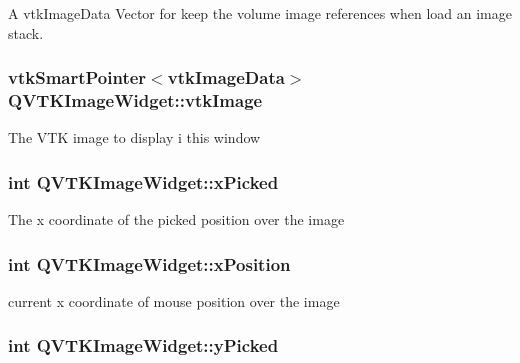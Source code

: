 A vtk\-Image\-Data Vector for keep the volume image references when load an image stack. 

\hypertarget{class_q_v_t_k_image_widget_aa55aaf6e037ee4d789449ff3d365201b}{
\subsubsection[{vtk\-Image}]{\setlength{\rightskip}{0pt plus 5cm}vtk\-Smart\-Pointer$<$vtk\-Image\-Data$>$ {\bf Q\-V\-T\-K\-Image\-Widget\-::vtk\-Image}}}\label{d8/dd7/class_q_v_t_k_image_widget_aa55aaf6e037ee4d789449ff3d365201b}
The V\-T\-K image to display i this window \hypertarget{class_q_v_t_k_image_widget_a17897def9ef084b36378099c51f94be3}{
\subsubsection[{x\-Picked}]{\setlength{\rightskip}{0pt plus 5cm}int {\bf Q\-V\-T\-K\-Image\-Widget\-::x\-Picked}}}\label{d8/dd7/class_q_v_t_k_image_widget_a17897def9ef084b36378099c51f94be3}
The x coordinate of the picked position over the image \hypertarget{class_q_v_t_k_image_widget_afd88ea5dbed175232b0c15cbe4cdca89}{
\subsubsection[{x\-Position}]{\setlength{\rightskip}{0pt plus 5cm}int {\bf Q\-V\-T\-K\-Image\-Widget\-::x\-Position}}}\label{d8/dd7/class_q_v_t_k_image_widget_afd88ea5dbed175232b0c15cbe4cdca89}
current x coordinate of mouse position over the image \hypertarget{class_q_v_t_k_image_widget_a484346a1e5c956917e7e35a22aee125a}{
\subsubsection[{y\-Picked}]{\setlength{\rightskip}{0pt plus 5cm}int {\bf Q\-V\-T\-K\-Image\-Widget\-::y\-Picked}}}\label{d8/dd7/class_q_v_t_k_image_widget_a484346a1e5c956917e7e35a22aee125a}
